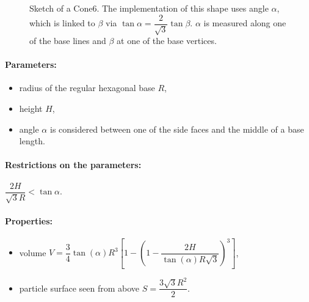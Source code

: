 \begin{figure}[ht]
\hfill
{}
\hfill
{}
\hfill
\caption{Sketch of a Cone6.  The implementation of this shape uses angle
  $\alpha$, which is linked to $\beta$ via $\tan \alpha = \dfrac{2}{\sqrt{3}} \tan 
  \beta$. $\alpha$ is measured along one of the base lines and $\beta$
  at one of the base vertices.}
\label{fig:cone6}
\end{figure}

\FloatBarrier

\paragraph{Parameters:}
\begin{itemize}
\item radius of the regular hexagonal base $R$,
\item height $H$,
\item angle $\alpha$ is considered between one of the side faces and
  the middle of a base length. 
\end{itemize}

\paragraph{Restrictions on the parameters:} 
$\dfrac{2H}{\sqrt{3}R}< \tan{\alpha}$.

\paragraph{Properties:}
\begin{itemize}
\item volume $V = \dfrac{3}{4} \tan(\alpha) R^3 \left[
            1 - \left(1- \dfrac{2H}{ \tan(\alpha) R\sqrt{3}}\right)^3
            \right]$,
\item  particle surface seen from above $S =\dfrac{3\sqrt{3}R^2}{2}$.
\end{itemize}

